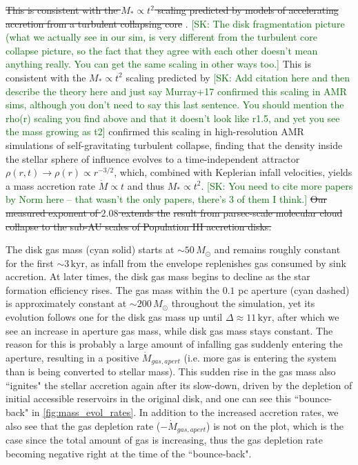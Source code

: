 \documentclass[twocolumn]{openjournal}
\newcommand{\Msun}{M_\odot}
\newcommand{\kyr}{\,\mathrm{kyr}}
\newcommand{\skcomment}[1]{{\textcolor{darkgreen}{[SK: #1]}}}
\newcommand{\skcut}[1]{{\textcolor{scut}{\sout{#1}}}}
\newcommand{\skadd}[1]{{\textcolor{orange(ryb)}{#1}}}
\begin{document}
\skcut{This is consistent with the $M_* \propto t^2$
	scaling predicted by models of accelerating accretion from a
	turbulent collapsing core} \citep{mckee03}. \skcomment{The disk fragmentation picture (what we actually see in our sim, is very different from the turbulent core collapse picture, so the fact that they agree with each other doesn't mean anything really. You can get the same scaling in other ways too.} \skadd{This is consistent with the $M_* \propto t^2$ scaling predicted by} \skcomment{Add citation here and then describe the theory here and just say Murray+17 confirmed this scaling in AMR sims, although you don't need to say this last sentence. You should mention the rho(r) scaling you find above and that it doesn't look like r1.5, and yet you see the mass growing as t2}
\citet{murray16} confirmed this scaling in high-resolution AMR
simulations of self-gravitating turbulent collapse, finding that
the density inside the stellar sphere of influence evolves to a
time-independent attractor $\rho(r,t) \to \rho(r) \propto r^{-3/2}$,
which, combined with Keplerian infall velocities, yields a mass
accretion rate $\dot{M} \propto t$ and thus $M_* \propto t^2$. \skcomment{You need to cite more papers by Norm here -- that wasn't the only papers, there's 3 of them I think.}
\skcut{Our measured exponent of $2.08$ extends the} \citet{murray16} \skcut{result from
	parsec-scale molecular cloud collapse to the sub-AU scales of
	Population III accretion disks.}

The disk gas mass (cyan solid) starts at $\sim 50\,\Msun$ and
remains roughly constant for the first $\sim 3\kyr$, as infall
from the envelope replenishes gas consumed by sink accretion.
At later times, the disk gas mass begins to decline as the star
formation efficiency rises.
The gas mass within the $0.1$ pc aperture (cyan dashed) is
approximately constant at $\sim 200\,\Msun$ throughout the
simulation, yet its evolution follows one for the disk gas mass up until
$\Delta \approx 11\kyr$, after which we see an increase in aperture gas mass,
while disk gas mass stays constant. The reason for this is probably a large
amount of infalling gas suddenly entering the aperture, resulting in a
positive $\dot{M} _{gas,apert}$ (i.e. more gas is entering the system
than is being converted to stellar mass). This sudden rise in the gas mass
also ``ignites" the stellar accretion again after its slow-down, driven by the
depletion of initial accessible reservoirs in the original disk,
and one can see this ``bounce-back" in \autoref{fig:mass_evol_rates}.
In addition to the increased accretion rates, we also see that the
gas depletion rate ($- \dot{M}_{gas, apert}$) is not on the plot,
which is the case since the total amount of gas is increasing, thus the gas
depletion rate becoming negative right at the time of the ``bounce-back".
\end{document}
